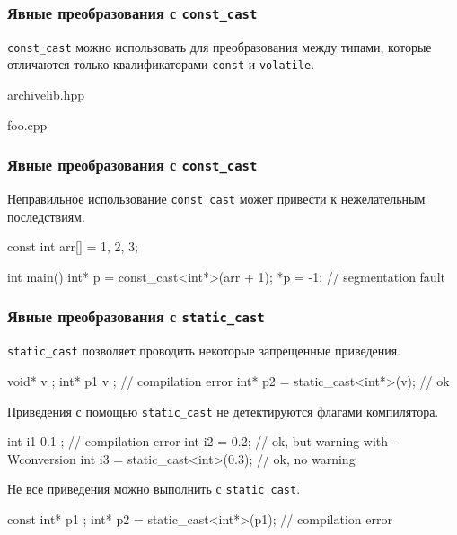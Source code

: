 \documentclass[compress, 8pt]{beamer}
\begin{document}
\begin{frame}[fragile]

    \frametitle{Явные преобразования с \texttt{const\_cast}}

    \hfill\break
    \verb|const_cast| можно использовать для преобразования между
    типами, которые отличаются только квалификаторами \verb|const| и \verb|volatile|.

        {archivelib.hpp}

        {foo.cpp}

\end{frame}

\begin{frame}[fragile]

    \frametitle{Явные преобразования с \texttt{const\_cast}}

    Неправильное использование \verb|const_cast| может привести к нежелательным
    последствиям.

    \begin{myinplacelisting}[minted language=cpp]
const int arr[] = {1, 2, 3};

int main() {
    int* p = const_cast<int*>(arr + 1);
    *p = -1; // segmentation fault
}
    \end{myinplacelisting}

\end{frame}

\begin{frame}[fragile]

    \frametitle{Явные преобразования с \texttt{static\_cast}}

    \verb|static_cast| позволяет проводить некоторые запрещенные приведения.

    \begin{myinplacelisting}[minted language=cpp]
void* v {};
int* p1 { v }; // compilation error
int* p2 = static_cast<int*>(v); // ok
    \end{myinplacelisting}

    Приведения с помощью \verb|static_cast| не детектируются флагами компилятора.

    \begin{myinplacelisting}[minted language=cpp]
int i1 { 0.1 }; // compilation error
int i2 = 0.2; // ok, but warning with -Wconversion
int i3 = static_cast<int>(0.3); // ok, no warning
    \end{myinplacelisting}

    Не все приведения можно выполнить с \verb|static_cast|.

    \begin{myinplacelisting}[minted language=cpp]
const int* p1 {};
int* p2 = static_cast<int*>(p1); // compilation error
    \end{myinplacelisting}

\end{frame}
\end{document}

